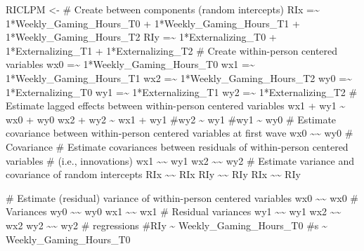 \documentclass{article}
\newenvironment{Shaded}{\begin{snugshade}}{\end{snugshade}}
\newcommand{\NormalTok}[1]{#1}
\newcommand{\OtherTok}[1]{\textcolor[rgb]{0.56,0.35,0.01}{#1}}
\newcommand{\StringTok}[1]{\textcolor[rgb]{0.31,0.60,0.02}{#1}}
\begin{document}
\begin{Shaded}
\begin{Highlighting}[]
\NormalTok{RICLPM }\OtherTok{\textless{}{-}} \StringTok{\textquotesingle{}}
\StringTok{  \# Create between components (random intercepts)}
\StringTok{  RIx =\textasciitilde{} 1*Weekly\_Gaming\_Hours\_T0 + 1*Weekly\_Gaming\_Hours\_T1 + 1*Weekly\_Gaming\_Hours\_T2}
\StringTok{  RIy =\textasciitilde{} 1*Externalizing\_T0 + 1*Externalizing\_T1 + 1*Externalizing\_T2}
\StringTok{  }
\StringTok{  \# Create within{-}person centered variables}
\StringTok{  wx0 =\textasciitilde{} 1*Weekly\_Gaming\_Hours\_T0}
\StringTok{  wx1 =\textasciitilde{} 1*Weekly\_Gaming\_Hours\_T1}
\StringTok{  wx2 =\textasciitilde{} 1*Weekly\_Gaming\_Hours\_T2 }
\StringTok{  wy0 =\textasciitilde{} 1*Externalizing\_T0}
\StringTok{  wy1 =\textasciitilde{} 1*Externalizing\_T1}
\StringTok{  wy2 =\textasciitilde{} 1*Externalizing\_T2}
\StringTok{  }
\StringTok{  \# Estimate lagged effects between within{-}person centered variables}
\StringTok{  wx1 + wy1 \textasciitilde{} wx0 + wy0}
\StringTok{  wx2 + wy2 \textasciitilde{} wx1 + wy1}
\StringTok{  \#wy2 \textasciitilde{} wy1}
\StringTok{  \#wy1 \textasciitilde{} wy0}
\StringTok{  }
\StringTok{  \# Estimate covariance between within{-}person centered variables at first wave}
\StringTok{  wx0 \textasciitilde{}\textasciitilde{} wy0 \# Covariance}
\StringTok{  }
\StringTok{  \# Estimate covariances between residuals of within{-}person centered variables }
\StringTok{  \# (i.e., innovations)}
\StringTok{  wx1 \textasciitilde{}\textasciitilde{} wy1}
\StringTok{  wx2 \textasciitilde{}\textasciitilde{} wy2}
\StringTok{  }
\StringTok{  \# Estimate variance and covariance of random intercepts}
\StringTok{  RIx \textasciitilde{}\textasciitilde{} RIx}
\StringTok{  RIy \textasciitilde{}\textasciitilde{} RIy}
\StringTok{  RIx \textasciitilde{}\textasciitilde{} RIy}

\StringTok{  \# Estimate (residual) variance of within{-}person centered variables}
\StringTok{  wx0 \textasciitilde{}\textasciitilde{} wx0 \# Variances}
\StringTok{  wy0 \textasciitilde{}\textasciitilde{} wy0}
\StringTok{  wx1 \textasciitilde{}\textasciitilde{} wx1 \# Residual variances}
\StringTok{  wy1 \textasciitilde{}\textasciitilde{} wy1}
\StringTok{  wx2 \textasciitilde{}\textasciitilde{} wx2}
\StringTok{  wy2 \textasciitilde{}\textasciitilde{} wy2}
\StringTok{  }
\StringTok{\# regressions}
\StringTok{\#RIy \textasciitilde{} Weekly\_Gaming\_Hours\_T0}
\StringTok{\#s \textasciitilde{} Weekly\_Gaming\_Hours\_T0 }
\StringTok{\textquotesingle{}}


\end{Highlighting}
\end{Shaded}
\end{document}
